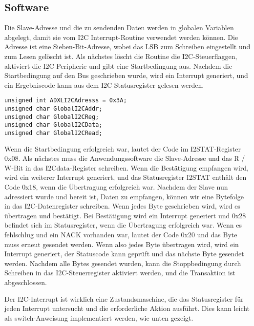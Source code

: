 \subsection{Software}
Die Slave-Adresse und die zu sendenden Daten werden in globalen Variablen abgelegt, damit sie vom I2C Interrupt-Routine verwendet werden können. Die Adresse ist eine Sieben-Bit-Adresse, wobei das LSB zum Schreiben eingestellt und zum Lesen gelöscht ist. Als nächstes löscht die Routine die I2C-Steuerflaggen, aktiviert die I2C-Peripherie und gibt eine Startbedingung aus. Nachdem die Startbedingung auf den Bus geschrieben wurde, wird ein Interrupt generiert, und ein Ergebniscode kann aus dem I2C-Statusregister gelesen werden.

\begin{lstlisting}
unsigned int ADXLI2CAdresss = 0x3A;
unsigned char GlobalI2CAddr;
unsigned char GlobalI2CReg;
unsigned char GlobalI2CData;
unsigned char GlobalI2CRead;
\end{lstlisting}

Wenn die Startbedingung erfolgreich war, lautet der Code im I2STAT-Register 0x08. Als nächstes muss die Anwendungssoftware die Slave-Adresse und das R / W-Bit in das I2Cdata-Register schreiben. Wenn die Bestätigung empfangen wird, wird ein weiterer Interrupt generiert, und das Statusregister I2STAT enthält den Code 0x18, wenn die Übertragung erfolgreich war. Nachdem der Slave nun adressiert wurde und bereit ist, Daten zu empfangen, können wir eine Bytefolge in das I2C-Datenregister schreiben. Wenn jedes Byte geschrieben wird, wird es übertragen und bestätigt. Bei Bestätigung wird ein Interrupt generiert und 0x28 befindet sich im Statusregister, wenn die Übertragung erfolgreich war. Wenn es fehlschlug und ein NACK vorhanden war, lautet der Code 0x20 und das Byte muss erneut gesendet werden. Wenn also jedes Byte übertragen wird, wird ein Interrupt generiert, der Statuscode kann geprüft und das nächste Byte gesendet werden. Nachdem alle Bytes gesendet wurden, kann die Stoppbedingung durch Schreiben in das I2C-Steuerregister aktiviert werden, und die Transaktion ist abgeschlossen. 



Der I2C-Interrupt ist wirklich eine Zustandsmaschine, die das Statusregister für jeden Interrupt untersucht und die erforderliche Aktion ausführt. Dies kann leicht als switch-Anweisung implementiert werden, wie unten gezeigt.
